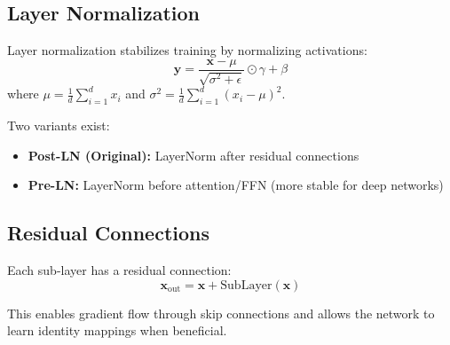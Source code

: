 \subsection{Layer Normalization}

Layer normalization stabilizes training by normalizing activations:
\begin{equation}
\mathbf{y} = \frac{\mathbf{x} - \mu}{\sqrt{\sigma^2 + \epsilon}} \odot \gamma + \beta
\end{equation}
where $\mu = \frac{1}{d}\sum_{i=1}^d x_i$ and $\sigma^2 = \frac{1}{d}\sum_{i=1}^d (x_i - \mu)^2$.

Two variants exist:
\begin{itemize}
    \item \textbf{Post-LN (Original):} LayerNorm after residual connections
    \item \textbf{Pre-LN:} LayerNorm before attention/FFN (more stable for deep networks)
\end{itemize}

\subsection{Residual Connections}

Each sub-layer has a residual connection:
\begin{equation}
\mathbf{x}_{\text{out}} = \mathbf{x} + \text{SubLayer}(\mathbf{x})
\end{equation}

This enables gradient flow through skip connections and allows the network to learn identity mappings when beneficial.

